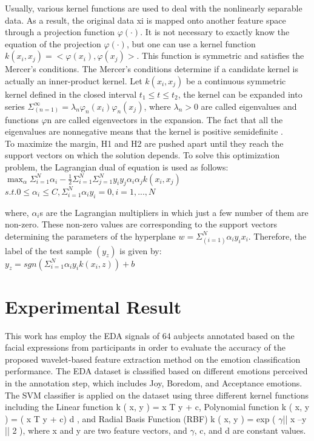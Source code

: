 Usually, various kernel functions are used to deal with the nonlinearly separable data. 
As a result, the original data xi is mapped onto another feature space through a 
projection function ${\varphi(\cdot)}$. It is not necessary to exactly know the equation of the 
projection ${\varphi(\cdot)}$, but one can use a kernel function ${k(x_i,x_j)=<\varphi(x_i),\varphi(x_j)>}$. 
This function is symmetric and satisfies the Mercer’s conditions. The Mercer’s conditions determine 
if a candidate kernel is actually an inner-product kernel. Let ${k(x_i,x_j)}$ be a continuous 
symmetric kernel defined in the closed interval ${t_1\leq t\leq t_2}$, the kernel can be expanded 
into series ${\Sigma_(n=1)^\infty = \lambda_n\varphi_n(x_i)\varphi_n(x_j)}$, where 
${\lambda_n > 0}$ are called eigenvalues and functions $\varphi$n are called eigenvectors in the expansion. 
The fact that all the eigenvalues are nonnegative means that the kernel is positive 
semidefinite \cite{SupportVector1995}. \\

To maximize the margin, H1 and H2 are pushed apart until they reach the support vectors 
on which the solution depends. To solve this optimization problem, the Lagrangian dual 
of equation is used as follows:\\

$\max_\alpha \Sigma_{i=1}^{N} \alpha_i - \frac{1}{2} \Sigma_{i=1}^{N} \Sigma_{j=1}^{N} y_i y_j \alpha_i \alpha_j k(x_i, x_j)$\newline
$s.t. 0 \le \alpha_i \le C, \Sigma_{i=1}^{N} \alpha_i y_i = 0, i = 1, ..., N$\newline

where, ${\alpha_i}$s are the Lagrangian multipliers in which just a few number of them are 
non-zero. These non-zero values are corresponding to the support vectors determining 
the parameters of the hyperplane ${w = \Sigma_(i=1)^N\alpha_iy_ix_i }$. Therefore, the label 
of the test sample ${(y_z)}$ is given by:\\

$y_z = sgn(\Sigma_{i=1}^{N} \alpha_i y_i k(x_i, z)) + b$\newline


\section{Experimental Result}
This work has employ the EDA signals of 64 aubjects annotated based on the facial expressions from participants
in order to evaluate the accuracy of the proposed wavelet-based feature extraction method on the emotion classification
performance. The EDA dataset is classified based on different emotions perceived in the annotation step, which includes 
Joy, Boredom, and Acceptance emotions. The SVM classifier is applied on the dataset using three different kernel 
functions including the Linear function k ( x, y ) = x T y + c, Polynomial function k ( x, y ) = ( x T y + c) d , 
and Radial Basis Function (RBF) k ( x, y ) = exp ( $\gamma$|| x –y || 2 ), where x and y are two feature vectors, 
and $\gamma$, c, and d are constant values. \\

